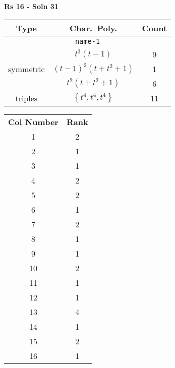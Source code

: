 \documentclass{article}
\begin{document}
    \textbf{Rs 16 - Soln 31}
    \begin{table}
    \begin{tabular}{|c|c|c|}
    \hline
    \textbf{Type} & \textbf{Char.~Poly.} & \textbf{Count} \\
    \hline \multicolumn{3}{|c|}{\texttt{name-1}} \\ \hline
    \multirow{3}{*}{symmetric}
    & $t^3(t - 1)$ & 9 \\
    & $(t - 1)^2(t + t^2 + 1)$ & 1 \\
    & $t^2(t + t^2 + 1)$ & 6 \\
    \hline
    \multirow{1}{*}{triples}
    & $\left\{t^4,t^4,t^4\right\}$ & 11 \\
    \hline
    \end{tabular}
    \end{table}
    \begin{table}
    \begin{tabular}{|c|c|}
    \hline
    \textbf{Col Number} & \textbf{Rank}\\
    1 & 2 \\ 
    2 & 1 \\ 
    3 & 1 \\ 
    4 & 2 \\ 
    5 & 2 \\ 
    6 & 1 \\ 
    7 & 2 \\ 
    8 & 1 \\ 
    9 & 1 \\ 
    10 & 2 \\ 
    11 & 1 \\ 
    12 & 1 \\ 
    13 & 4 \\ 
    14 & 1 \\ 
    15 & 2 \\ 
    16 & 1 \\ 
    \hline
    \end{tabular}
    \end{table}
    \newpage
\end{document}
